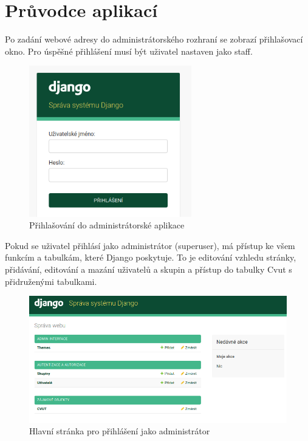 \chapter{Průvodce aplikací}
\label{Průvodce aplikací}


Po zadání webové adresy do administrátorského rozhraní se zobrazí přihlašovací okno. Pro úspěšné přihlášení musí být uživatel nastaven jako staff. 

\begin{figure}[H] \centering
  \includegraphics[width=200pt]{./pictures/50-prihlaseni.png}
    \caption[Přihlašování do administrátorské aplikace]{Přihlašování do administrátorské aplikace}
	\label{Přihlašování do administrátorské aplikace}                                
\end{figure}


Pokud se uživatel přihlásí jako administrátor (superuser), má přístup ke všem funkcím a tabulkám, které Django poskytuje. To je editování vzhledu stránky, přidávání, editování a mazání uživatelů a skupin a přístup do tabulky Cvut s přidruženými tabulkami.

\begin{figure}[H] \centering
  \includegraphics[width=420pt]{./pictures/51-mp-admin.png}
    \caption[Hlavní stránka pro přihlášení jako administrátor]{Hlavní stránka pro přihlášení jako administrátor}
	\label{Hlavní stránka pro přihlášení jako administrátor}                                
\end{figure}

